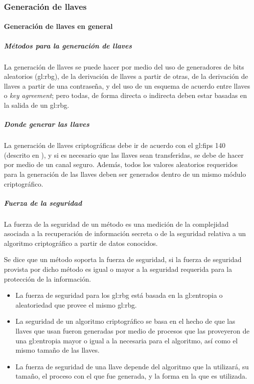 %
%

\subsubsection{Generación de llaves}
\label{sec:generacion_llaves}


\paragraph{Generación de llaves en general}

\subparagraph{Métodos para la generación de llaves}
La generación de llaves se puede hacer por medio del uso de generadores de
bits aleatorios (\gls{gl:rbg}), de la derivación de llaves a partir de otras,
de la derivación de llaves a partir de una contraseña, y del uso de un esquema
de acuerdo entre llaves o \textit{key agreement}; pero todas, de forma directa
o indirecta deben estar basadas en la salida de un \gls{gl:rbg}.

\subparagraph{Donde generar las llaves}
La generación de llaves criptográficas debe ir de acuerdo con el \gls{gl:fips}
140 (descrito en \cite{nist_modulos_criptograficos}), y si es necesario que
las llaves sean transferidas, se debe de hacer por medio de un canal seguro.
Además, todos los valores aleatorios requeridos para la generación de las
llaves deben ser generados dentro de un mismo módulo criptográfico.

\subparagraph{Fuerza de la seguridad}
La fuerza de la seguridad de un método es una medición de la complejidad
asociada a la recuperación de información secreta o de la seguridad relativa
a un algoritmo criptográfico a partir de datos conocidos.

Se dice que un método soporta la fuerza de seguridad, si la fuerza de
seguridad provista por dicho método es igual o mayor a la seguridad
requerida para la protección de la información.
\begin{itemize}

  \item La fuerza de seguridad para los \gls{gl:rbg} está basada en la
    \gls{gl:entropia} o aleatoriedad que provee el mismo \gls{gl:rbg}.

  \item La seguridad de un algoritmo criptográfico se basa en el hecho de
    que las llaves que usan fueron generadas por medio de procesos que las
    proveyeron de una \gls{gl:entropia} mayor o igual a la necesaria para el
    algoritmo, así como el mismo tamaño de las llaves.

  \item La fuerza de seguridad de una llave depende del algoritmo que la
    utilizará, su tamaño, el proceso con el que fue generada, y la forma en
    la que es utilizada.

\end{itemize}

